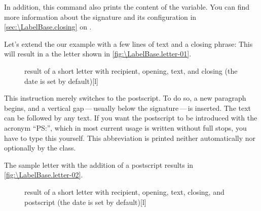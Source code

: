 In addition, this command also prints the content of the
 variable. You can find more
information about the signature and its configuration in
\autoref{sec:\LabelBase.closing} on
.

\begin{Example}
  Let's extend the our example with a few lines of text and a closing phrase:
  This will result in a the letter shown in \autoref{fig:\LabelBase.letter-01}.
  \begin{figure}
    \setcapindent{0pt}%
    \begin{captionbeside}{%
        result of a short letter with recipient, opening, text, and closing
        (the date is set by default)}[l]
    \end{captionbeside}
    \label{fig:\LabelBase.letter-01}
  \end{figure}
\end{Example}
%
\EndIndexGroup

\begin{Declaration}
\end{Declaration}%
This instruction merely switches to the postscript. To do so, a new paragraph
begins, and a vertical gap\,---\,usually below the signature\,---\,is
inserted. The  text can be followed by any text. If you want the
postscript to be introduced with the acronym ``PS:'', which in most current
usage is written without full stops, you have to type this yourself. This
abbreviation is printed neither automatically nor optionally by the
 class.

\begin{Example}
  The sample letter with the addition of a postscript
  results in \autoref{fig:\LabelBase.letter-02}.
  \begin{figure}
    \setcapindent{0pt}%
    \begin{captionbeside}{%
        result of a short letter with recipient, opening, text, closing, and
        postscript (the date is set by default)}[l]
    \end{captionbeside}
    \label{fig:\LabelBase.letter-02}
  \end{figure}
\end{Example}

